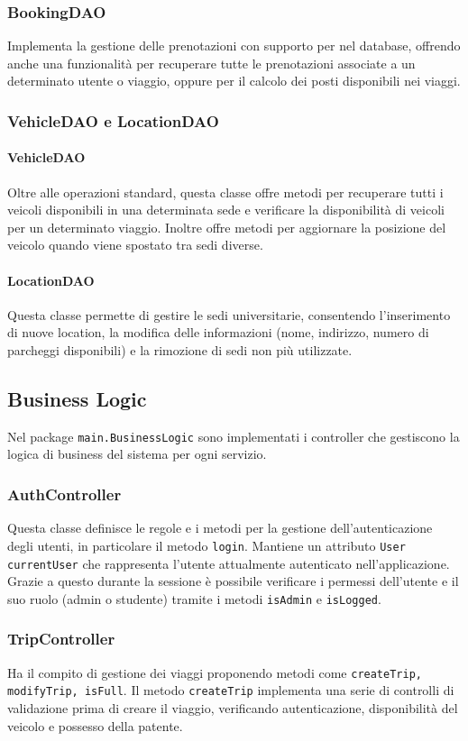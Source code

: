 \subsubsection{BookingDAO}
Implementa la gestione delle prenotazioni con supporto per nel database, offrendo anche una funzionalità per recuperare tutte le prenotazioni associate a un determinato utente o viaggio, oppure per il calcolo dei posti disponibili nei viaggi.
\subsubsection{VehicleDAO e LocationDAO}
\paragraph{VehicleDAO} Oltre alle operazioni standard, questa classe offre metodi per recuperare tutti i veicoli disponibili in una determinata sede e verificare la disponibilità di veicoli per un determinato viaggio. Inoltre offre metodi per aggiornare la posizione del veicolo quando viene spostato tra sedi diverse.

\paragraph{LocationDAO} Questa classe permette di gestire le sedi universitarie, consentendo l'inserimento di nuove location, la modifica delle informazioni (nome, indirizzo, numero di parcheggi disponibili) e la rimozione di sedi non più utilizzate.
\subsection{Business Logic}
Nel package \texttt{main.BusinessLogic} sono implementati i controller che gestiscono la logica di business del sistema per ogni servizio.
\subsubsection{AuthController}
Questa classe definisce le regole e i metodi per la gestione dell'autenticazione degli utenti, in particolare il metodo \texttt{login}. Mantiene un attributo \texttt{User currentUser} che rappresenta l'utente attualmente autenticato nell'applicazione.\\
Grazie a questo durante la sessione è possibile verificare i permessi dell'utente e il suo ruolo (admin o studente) tramite i metodi \texttt{isAdmin} e \texttt{isLogged}.
\subsubsection{TripController}
Ha il compito di gestione dei viaggi proponendo metodi come \texttt{createTrip, modifyTrip, isFull}. 
Il metodo \texttt{createTrip} implementa una serie di controlli di validazione prima di creare il viaggio, verificando autenticazione, disponibilità del veicolo e possesso della patente.
